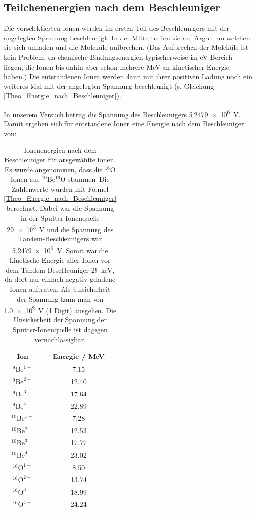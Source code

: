 \clearpage

\subsection{Teilchenenergien nach dem Beschleuniger}
Die vorselektierten Ionen werden im ersten Teil des Beschleunigers mit der angelegten Spannung beschleunigt.
In der Mitte treffen sie auf Argon, an welchem sie sich umladen und die Moleküle aufbrechen.
(Das Aufbrechen der Moleküle ist kein Problem, da chemische Bindungsenergien typischerweise im \si{\electronvolt}-Bereich liegen, die Ionen bis dahin aber schon mehrere \si{\mega\electronvolt} an kinetischer Energie haben.)
Die entstandenen Ionen werden dann mit ihrer positiven Ladung noch ein weiteres Mal mit der angelegten Spannung beschleunigt (s. Gleichung \ref{Theo_Energie_nach_Beschleuniger}).

In unserem Versuch betrug die Spannung des Beschleunigers \SI{5.2479e6}{\volt}.
Damit ergeben sich für entstandene Ionen eine Energie nach dem Beschleuniger von:
\begin{table}[H]
  \centering
  \caption{Ionenenergien nach dem Beschleuniger für ausgewählte Ionen. Es wurde angenommen, dass die $^{16}$O Ionen aus $^{10}$Be$^{16}$O stammen. Die Zahlenwerte wurden mit Formel \ref{Theo_Energie_nach_Beschleuniger} berechnet. Dabei war die Spannung in der Sputter-Ionenquelle \SI{29e3}{\volt} und die Spannung des Tandem-Beschleunigers war \SI{5.2479e6}{\volt}. Somit war die kinetische Energie aller Ionen vor dem Tandem-Beschleuniger \SI{29}{\kilo\electronvolt}, da dort nur einfach negativ geladene Ionen auftraten. Als Unsicherheit der Spannung kann man von \SI{1.0e2}{\volt} (1 Digit) ausgehen. Die Unsicherheit der Spannung der Sputter-Ionenquelle ist dagegen vernachlässigbar.}
  \begin{tabular}{|c|c|}
    \hline
    Ion & Energie / \si{\mega\electronvolt} \\
    \hline
    $^{9}\text{Be}^{1+}$ & \num{7.15} \\
    $^{9}\text{Be}^{2+}$ & \num{12.40} \\
    $^{9}\text{Be}^{3+}$ & \num{17.64} \\
    $^{9}\text{Be}^{4+}$ & \num{22.89} \\
    \hline
    $^{10}\text{Be}^{1+}$ & \num{7.28} \\
    $^{10}\text{Be}^{2+}$ & \num{12.53} \\
    $^{10}\text{Be}^{3+}$ & \num{17.77} \\
    $^{10}\text{Be}^{4+}$ & \num{23.02} \\
    \hline
    $^{16}\text{O}^{1+}$ & \num{8.50} \\
    $^{16}\text{O}^{2+}$ & \num{13.74} \\
    $^{16}\text{O}^{3+}$ & \num{18.99} \\
    $^{16}\text{O}^{4+}$ & \num{24.24} \\
    \hline
  \end{tabular}
  \label{Auswertung_tab_Ionenenergien_nach_Besch}
\end{table}

